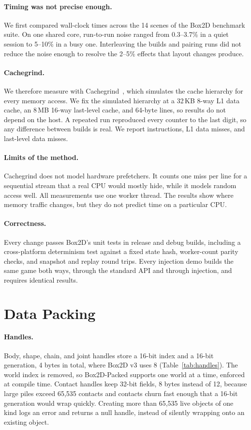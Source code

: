 \documentclass[11pt]{article}
\begin{document}
\paragraph{Timing was not precise enough.} We first compared wall-clock times across the 14 scenes
of the Box2D benchmark suite. On one shared core, run-to-run noise ranged from 0.3--3.7\% in a quiet
session to 5--10\% in a busy one. Interleaving the builds and pairing runs did not reduce the noise
enough to resolve the 2--5\% effects that layout changes produce.

\paragraph{Cachegrind.} We therefore measure with Cachegrind~\cite{nethercote2007valgrind}, which
simulates the cache hierarchy for every memory access. We fix the simulated hierarchy at a 32\,KB
8-way L1 data cache, an 8\,MB 16-way last-level cache, and 64-byte lines, so results do not depend
on the host. A repeated run reproduced every counter to the last digit, so any difference between
builds is real. We report instructions, L1 data misses, and last-level data misses.

\paragraph{Limits of the method.} Cachegrind does not model hardware prefetchers. It counts one
miss per line for a sequential stream that a real CPU would mostly hide, while it models random
access well. All measurements use one worker thread. The results show where memory traffic
changes, but they do not predict time on a particular CPU.

\paragraph{Correctness.} Every change passes Box2D's unit tests in release and debug builds,
including a cross-platform determinism test against a fixed state hash, worker-count parity
checks, and snapshot and replay round trips. Every injection demo builds the same game both ways,
through the standard API and through injection, and requires identical results.

\section{Data Packing}
\label{sec:packing}

\paragraph{Handles.} Body, shape, chain, and joint handles store a 16-bit index and a 16-bit
generation, 4 bytes in total, where Box2D v3 uses 8 (Table~\ref{tab:handles}). The world index is
removed, so Box2D-Packed supports one world at a time, enforced at compile time. Contact handles
keep 32-bit fields, 8 bytes instead of 12, because large piles exceed 65{,}535 contacts and
contacts churn fast enough that a 16-bit generation would wrap quickly. Creating more than 65{,}535
live objects of one kind logs an error and returns a null handle, instead of silently wrapping onto
an existing object.
\end{document}
